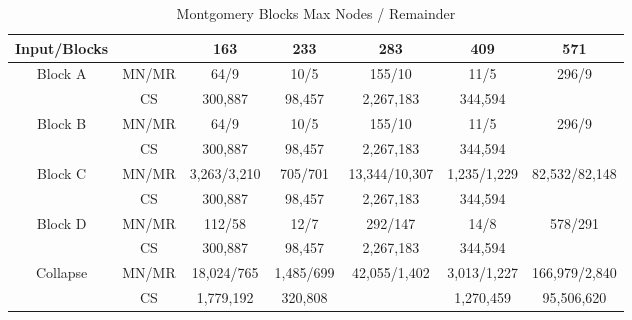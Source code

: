 \documentclass{article}
\begin{document}
\begin{table}
\centering
\caption{Montgomery Blocks  Max Nodes / Remainder}
\begin{tabular}{| c | c | c | c | c | c | c |} \hline
\textbf{Input/Blocks} &&  \textbf{163} & \textbf{233} &\textbf{283} & \textbf{409} & \textbf{571} \\ \hline
\multirow{2}{*}{Block A} &MN/MR&64/9&10/5&155/10&11/5& 296/9\\ \cline{2-7}
& CS&300,887 & 98,457& 2,267,183 & 344,594 & \\ \hline
\multirow{2}{*}{Block B} &MN/MR&64/9&10/5&155/10&11/5& 296/9\\ \cline{2-7}
& CS& 300,887 & 98,457&  2,267,183& 344,594 & \\ \hline
\multirow{2}{*}{Block C} &MN/MR&3,263/3,210&705/701&13,344/10,307&1,235/1,229& 82,532/82,148\\ \cline{2-7}
& CS& 300,887& 98,457&  2,267,183&344,594 & \\ \hline
\multirow{2}{*}{Block D} &MN/MR&112/58&12/7&292/147&14/8& 578/291\\ \cline{2-7}
& CS& 300,887& 98,457&  2,267,183& 344,594& \\ \hline
\multirow{2}{*}{Collapse} &MN/MR&18,024/765&1,485/699&42,055/1,402&3,013/1,227& 166,979/2,840\\ \cline{2-7}
& CS& 1,779,192& 320,808 & &1,270,459 &95,506,620 \\ \hline
\end{tabular}
\end{table}

\end{document}
